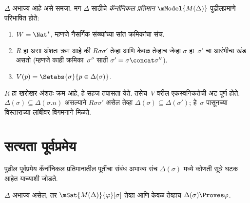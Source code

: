 \begin{defn}\label{int:sc:mod:defn:canonical-model}
  $\Delta$ अभाज्य आहे असे समजा.
  मग $\Delta$ साठीचे
  \emph{कॅनॉनिकल प्रतिमान}
  $\mModel{M(\Delta)}$ पुढीलप्रमाणे परिभाषित होते:
  \begin{enumerate}
  \item $W = \Nat^*$, म्हणजे नैसर्गिक
    संख्यांच्या सांत क्रमिकांचा संच.
  \item $R$ हा असा अंशतः क्रम आहे की
    $R\sigma\sigma'$ तेव्हा आणि केवळ
    तेव्हाच जेव्हा $\sigma$ हा~$\sigma'$
    चा आरंभीचा खंड असतो (म्हणजे
    काही क्रमिका~$\sigma''$ साठी
    $\sigma' = \sigma \concat \sigma''$).
  \item $V(p) = \Setabs{\sigma}{p \in \Delta(\sigma)}$.
  \end{enumerate}
\end{defn}

$R$ हा खरोखर अंशतः क्रम आहे,
हे सहज तपासता येते. तसेच~$V$ वरील
एकस्वनिकतेची अट पूर्ण होते.
$\Delta(\sigma) \subseteq \Delta(\sigma.n)$
असल्याने $R\sigma\sigma'$ असेल तेव्हा
$\Delta(\sigma) \subseteq \Delta(\sigma')$;
हे~$\sigma$ पासूनच्या विस्ताराच्या
लांबीवर विगमनाने मिळते.












\section{सत्यता पूर्वप्रमेय}\label{int:sc:tru:sec}

पुढील पूर्वप्रमेय कॅनॉनिकल प्रतिमानातील
पूर्तीचा संबंध अभाज्य संच
$\Delta(\sigma)$ मध्ये कोणती
सूत्रे घटक आहेत
याच्याशी जोडते.

\begin{lem}\label{int:sc:tru:lem:truth}
  $\Delta$ अभाज्य असेल, तर
  $\mSat{M(\Delta)}{\varphi}[\sigma]$
  तेव्हा आणि केवळ तेव्हाच
  $\Delta(\sigma) \Proves \varphi$.
\end{lem}

